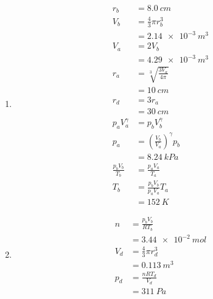 \documentclass{article}
\begin{document}
\setcounter{subsubsection}{56}
\subsubsection{}

\begin{enumerate}
  \item

        \begin{align*}
          r_b                 & = \qty{8.0}{cm}                             \\
          V_b                 & = \frac{4}{3} \pi r_b^3                     \\
                              & = \qty{2.14e-3}{m^3}                        \\
          V_a                 & = 2 V_b                                     \\
                              & = \qty{4.29e-3}{m^3}                        \\
          r_a                 & = \sqrt[3]{\frac{3 V_a}{4 \pi}}             \\
                              & = \qty{10}{cm}                              \\
          r_d                 & = 3 r_a                                     \\
                              & = \qty{30}{cm}                              \\
          p_a V_a^\gamma      & = p_b V_b^\gamma                            \\
          p_a                 & = \left( \frac{V_b}{V_a} \right)^\gamma p_b \\
                              & = \qty{8.24}{kPa}                           \\
          \frac{p_b V_b}{T_b} & = \frac{p_a V_a}{T_a}                       \\
          T_b                 & = \frac{p_b V_b}{p_a V_a} T_a               \\
                              & = \qty{152}{K}
        \end{align*}

  \item

        \begin{align*}
          n   & = \frac{p_b V_b}{R T_b} \\
              & = \qty{3.44e-2}{mol}    \\
          V_d & = \frac{4}{3} \pi r_d^3 \\
              & = \qty{0.113}{m^3}      \\
          p_d & = \frac{n R T_d}{V_d}   \\
              & = \qty{311}{Pa}
        \end{align*}


\end{enumerate}
\end{document}
